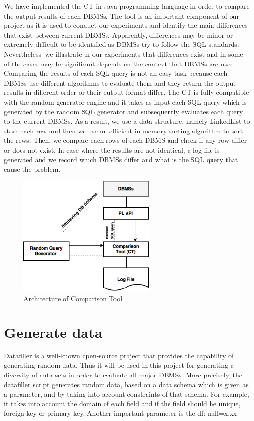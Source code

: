 We have implemented the CT in Java programming language in order to compare the output results of each DBMSs. The tool is an important component of our project as it is used to conduct our experiments and identify the main differences that exist between current DBMSs. Apparently, differences may be minor or extremely difficult to be identified as DBMSs try to follow the SQL standards. Nevertheless, we illustrate in our experiments that differences exist and in some of the cases may be significant depends on the context that DBMSs are used. Comparing the results of each SQL query is not an easy task because each DBMSs use different algorithms to evaluate them and they return the output results in different order or their output format differ. The CT is fully compatible with the random generator engine and it takes as input each SQL query which is generated by the random SQL generator and subsequently evaluates each query to the current DBMSs. As a result, we use a data structure, namely LinkedList to store each row and then we use an efficient in-memory sorting algorithm to sort the rows. Then, we compare each rows of each DBMS and check if any row differ or does not exist. In case where the results are not identical, a log file is generated and we record which DBMSs differ and what is the SQL query that cause the problem.

 \begin{figure} 
      \centering
      \includegraphics[width=\textwidth,height=6cm]{Images/Chapter4/3-ComparisonTool}
      \caption{Architecture of Comparison Tool}
      \label{fig:counting-methods}
  \end{figure}

\section{Generate data}
Datafiller is a well-known open-source project that provides the capability of generating random data. Thus it will be used in this project for generating a diversity of  data sets in order to evaluate all major DBMSs. More precisely, the datafiller script generates random data, based on a data schema which is given as a parameter, and by taking into account constraints of that schema. For example, it takes into account the domain of each field and if the field should be unique, foreign key or primary key. Another important parameter is the df: null=x.xx%

